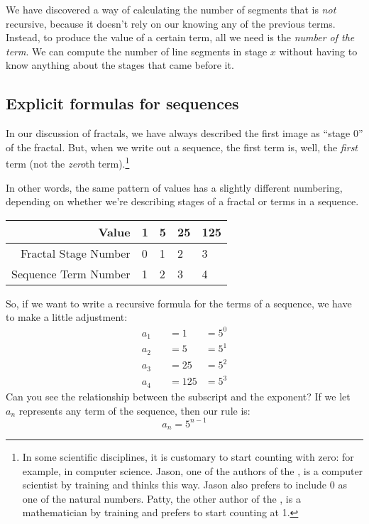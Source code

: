 We have discovered a way of calculating the number of segments that is \textit{not} recursive, because it doesn't rely on our knowing any of the previous terms. Instead, to produce the value of a certain term, all we need is the \textit{number of the term}. We can compute the number of line segments in stage $x$ without having to know anything about the stages that came before it.

\subsection{Explicit formulas for sequences}

In our discussion of fractals, we have always described the first image as ``stage 0'' of the fractal. But, when we write out a sequence, the first term is, well, the \textit{first} term (not the \textit{zero}th term).\footnote{In some scientific disciplines, it is customary to start counting with zero: for example, in computer science. Jason, one of the authors of the \algebranomicon, is a computer scientist by training and thinks this way. Jason also prefers to include 0 as one of the natural numbers. Patty, the other author of the \algebranomicon, is a mathematician by training and prefers to start counting at 1.}

In other words, the same pattern of values has a slightly different numbering, depending on whether we're describing stages of a fractal or terms in a sequence.

\begin{center}\begin{tabular}{rC{0.75cm}C{0.75cm}C{0.75cm}C{0.75cm}}
Value & {1} & {5} & {25} & {125}
\\\hline
Fractal Stage Number & 0 & 1 & 2 & 3
\\
Sequence Term Number & 1 & 2 & 3 & 4
\end{tabular}\end{center}

So, if we want to write a recursive formula for the terms of a sequence, we have to make a little adjustment:
\[\begin{aligned}
a_1 &\quad= 1 &= 5^0
\\
a_2 &\quad= 5 &= 5^1
\\
a_3 &\quad= 25 &= 5^2
\\
a_4 &\quad= 125 &= 5^3
\end{aligned}
\]
Can you see the relationship between the subscript and the exponent? If we let $a_n$ represents any term of the sequence, then our rule is:
\[a_n = 5^{n-1}\]

